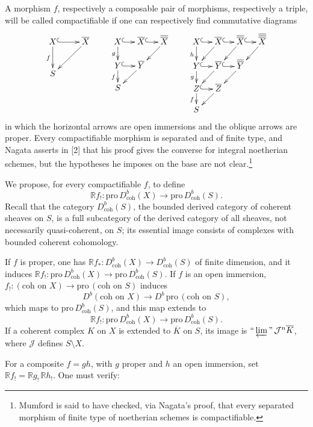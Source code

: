 \documentclass[12pt]{amsart}
\theoremstyle{plain}
\theoremstyle{definition}
\newcommand{\Pro}{\text{pro}\,}
\newcommand{\coh}{\text{coh}}
\newcommand{\cJ}{\mathcal{J}}
\newcommand{\cDb}{D^{b}}
\newcommand{\bR}{\mathbb{R}}
\begin{document}
A morphism $f$, respectively a composable pair of morphisms, respectively a triple, will be called compactifiable if one can respectively find commutative diagrams
\[
\xymatrix{
X \ar@{^{(}->}[r] \ar[d]_f & \overline X \ar[dl] \\
S &
}
\qquad
\xymatrix@C=1.25em@R=1.25em{
X \ar@{^{(}->}[r] \ar[d]_g & \overline X \ar@{^{(}->}[r] & \overline{\overline X} \ar[dl] \\
Y \ar@{^{(}->}[r] \ar[d]_f & \overline Y \ar[dl] \\
S &&
}
\qquad
\xymatrix@C=1.1em@R=1.1em{
X \ar@{^{(}->}[r] \ar[d]_h & \overline X \ar@{^{(}->}[r] \ar[dl] & \overline{\overline X} \ar@{^{(}->}[r] \ar[dl] & \overline{\overline{\overline X}} \ar[dl] \\
Y \ar@{^{(}->}[r] \ar[d]_g & \overline Y \ar@{^{(}->}[r] \ar[dl] & \overline{\overline Y} \ar[dl] & \\
Z \ar@{^{(}->}[r] \ar[d]_f & \overline Z \ar[dl] & & \\
S & & &
}
\]
in which the horizontal arrows are open immersions and the oblique arrows are proper. Every compactifiable morphism is separated and of finite type, and Nagata asserts in [2] that his proof gives the converse for integral noetherian schemes, but the hypotheses he imposes on the base are not clear.\footnote{Mumford is said to have checked, via Nagata's proof, that every separated morphism of finite type of noetherian schemes is compactifiable.}

We propose, for every compactifiable $f$, to define
\[
\bR f_!:\Pro\cDb_{\coh}(X)\to\Pro\cDb_{\coh}(S).
\]
Recall that the category $\cDb_{\coh}(S)$, the bounded derived category of coherent sheaves on $S$, is a full subcategory of the derived category of all sheaves, not necessarily quasi-coherent, on $S$; its essential image consists of complexes with bounded coherent cohomology.

If $f$ is proper, one has $\bR f_*:\cDb_{\coh}(X)\to\cDb_{\coh}(S)$ of finite dimension, and it induces $\bR f_!:\Pro\cDb_{\coh}(X)\to\Pro\cDb_{\coh}(S)$. If $f$ is an open immersion, $f_!:(\text{coh on }X)\to\Pro(\text{coh on }S)$ induces
\[
\cDb(\text{coh on }X)\to\cDb\,\Pro(\text{coh on }S),
\]
which maps to $\Pro\cDb_{\coh}(S)$, and this map extends to
\[
\bR f_!:\Pro\cDb_{\coh}(X)\to\Pro\cDb_{\coh}(S).
\]
If a coherent complex $K$ on $X$ is extended to $\overline K$ on $S$, its image is $\text{``}\varprojlim\text{''}\,\cJ^n\overline K$, where $\cJ$ defines $S\setminus X$.

For a composite $f=gh$, with $g$ proper and $h$ an open immersion, set $\bR f_!=\bR g_!\,\bR h_!$. One must verify:
\end{document}
